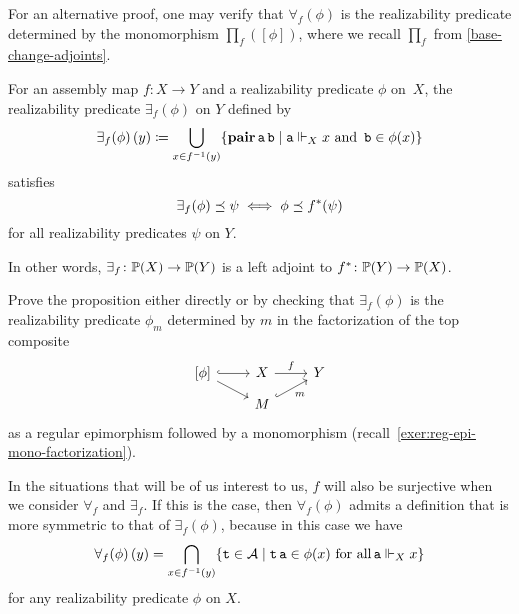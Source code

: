For an alternative proof, one may verify that \(\forall_f(\phi)\) is the
realizability predicate determined by the monomorphism \(\prod_f([\phi])\),
where we recall \(\prod_f\) from \cref{base-change-adjoints}.

\begin{proposition}
  For an assembly map \(f \colon X \to Y\) and a realizability predicate
  \(\phi\) on~\(X\), the realizability predicate \(\exists_f(\phi)\) on \(Y\)
  defined by
  \[
    {\exists_f(\phi)}\,(y) \coloneqq
    \bigcup_{x \in f^{-1}(y)}\{\operatorname{\mathbf{pair}}\operatorname{\mathtt{a}}\operatorname{\mathtt{b}}
      \mid \operatorname{\mathtt{a}} \Vdash_X x \text{ and } \operatorname{\mathtt{b}} \in \phi(x)\}
  \]
  satisfies
  \[
    \exists_f(\phi) \preceq \psi \iff \phi \preceq f^\ast(\psi)
  \]
  for all realizability predicates \(\psi\) on \(Y\).

  In other words, \(\exists_f \colon \mathbb P(X) \to \mathbb P(Y)\) is a left
  adjoint to \(f^\ast \colon \mathbb P(Y) \to \mathbb P(X)\).
\end{proposition}
\begin{exercise}\label{exer:exists-predicate}
  Prove the proposition either directly or by checking that \(\exists_f(\phi)\)
  is the realizability predicate \(\phi_m\) determined by \(m\) in the
  factorization of the top composite
  \[
    \begin{tikzcd}[row sep=2mm,column sep=8mm]
      {[\phi]} \ar[dr] \ar[r,hookrightarrow] & X \ar[r,"f"] & Y \\
      & M \ar[ur,hookrightarrow,"m"']
    \end{tikzcd}
  \]
  as a regular epimorphism followed by a monomorphism
  (recall~\cref{exer:reg-epi-mono-factorization}).
\end{exercise}

In the situations that will be of us interest to us, \(f\) will also be
surjective when we consider \(\forall_f\) and \(\exists_f\).
%
If this is the case, then \(\forall_f(\phi)\) admits a definition that is more
symmetric to that of \(\exists_f(\phi)\), because in this case we have
\[
  \forall_f(\phi)\,(y) = \bigcap_{x \in f^{-1}(y)}
  \{\operatorname{\mathtt{t}} \in \mathcal A \mid
    \operatorname{\mathtt{t}}\operatorname{\mathtt{a}} \in \phi(x) \text{ for all} \operatorname{\mathtt{a}} \Vdash_X x\}
\]
for any realizability predicate \(\phi\) on \(X\).

